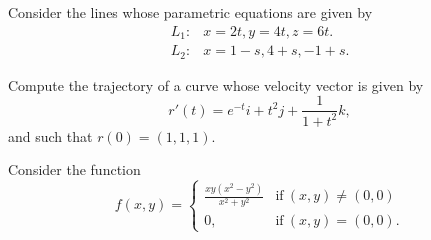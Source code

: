 \documentclass[11pt]{exam}
\begin{document}
\begin{questions}
\newpage 


\addpoints 
\question Consider the lines whose parametric equations are given by 
\begin{align*}
L_1 \colon  & x=2t, y=4t, z=6t.\\
L_2 \colon & x=1-s, 4+s, -1+s.
\end{align*}


\newpage

\addpoints
\question[10] Compute the trajectory of a curve whose velocity vector is given by 
\begin{equation*}
r'(t)= e^{-t}i + t^2j + \frac{1}{1+t^2} k,
\end{equation*}
and such that $r(0)=(1,1,1)$. 
\newpage

\addpoints

\addpoints
\question Consider the function
\begin{equation*}
f(x,y)=\left\{
\begin{array}{rc}
\frac{xy(x^2-y^2)}{x^2+y^2} & \mbox{if} \ (x,y) \neq (0,0)\\
0, & \mbox{if} \ (x,y)=(0,0).
\end{array}
\right.
\end{equation*}

\begin{parts}

\end{parts}
\end{questions}
\end{document}
